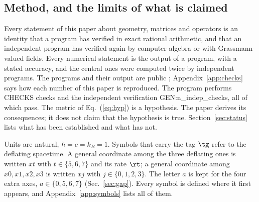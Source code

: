 \subsection{Method, and the limits of what is claimed}

Every statement of this paper about geometry, matrices and operators is an identity that a program
has verified in exact rational arithmetic, and that an independent program has verified again by
computer algebra or with Grassmann-valued fields. Every numerical statement is the output of a
program, with a stated accuracy, and the central ones were computed twice by independent programs.
The programs and their output are public \cite{DeflationRepo}; Appendix~\ref{app:checks} says how each
number of this paper is reproduced. The program performs {{CHECKS}} checks and the independent
verification {{GEN:n_indep_checks}}, all of which pass. The metric of Eq.~(\ref{eq:hyp}) is a
hypothesis. The paper derives its consequences; it does not claim that the hypothesis is true.
Section~\ref{sec:status} lists what has been established and what has not.

Units are natural, $\hbar=c=k_B=1$. Symbols that carry the tag $\tg$ refer to the deflating
 spacetime. A general coordinate among the three deflating ones is written $xt$ with
$t\in\{5,6,7\}$ and its rate $\rt$; a general coordinate among $x0,x1,x2,x3$ is written $xj$ with
$j\in\{0,1,2,3\}$. The letter $a$ is kept for the four extra axes, $a\in\{0,5,6,7\}$
(Sec.~\ref{sec:gap}). Every symbol is defined where it first appears, and Appendix~\ref{app:symbols}
lists all of them.
